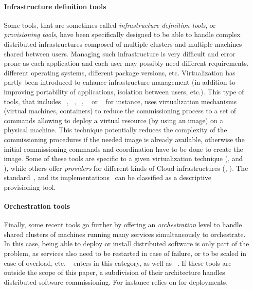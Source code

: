 \paragraph{Infrastructure definition tools}
Some tools, that are sometimes called \emph{infrastructure definition tools}, or \emph{provisioning tools}, have been specifically designed to be able to handle complex distributed infrastructures composed of multiple clusters and multiple machines shared between users. Managing such infrastructure is very difficult and error prone as each application and each user may possibly need different requirements, different operating systems, different package versions, etc. Virtualization has partly been introduced to enhance infrastructure management (in addition to improving portability of applications, isolation between users, etc.). This type of tools, that includes \docker~\cite{docker:web}, \terraform~\cite{terraform:web}, \juju~\cite{juju:web}, \cloudformation~\cite{cloudf:web} or \heat~\cite{heat:web} for instance, uses virtualization mechanisms (\eg virtual machines, containers) to reduce the commissioning process to a set of commands allowing to deploy a virtual resource (by using an image) on a physical machine. This technique potentially reduces the complexity of the commissioning procedures if the needed image is already available, otherwise the initial commissioning commands and coordination have to
be done to create the image. Some of these tools are specific to a given virtualization technique (\eg \docker, \cloudformation and \heat), while others offer \emph{providers} for different kinds of Cloud infrastructures (\eg \terraform, \juju). The \tosca standard~\cite{tosca:web}, and its
implementations~\cite{Binz2013,cloudify:web,opentosca:web,8599581} can be classified as a descriptive provisioning tool.

\paragraph{Orchestration tools}
Finally, some recent tools go further by offering an \emph{orchestration} level to handle shared clusters of machines running many services simultaneously to orchestrate. In this case, being able to deploy or install distributed software is only part of the problem, as services also need to be restarted in case of failure, or to be scaled in case of overload, etc. \kubernetes~\cite{kubernetes:web} enters in this category, as well as \dockerswarm~\cite{dockerswarm:web}. If these tools are outside the scope of this paper, a subdivision of their architecture handles distributed software commissioning. For instance \kubernetes relies on \docker for deployments. 

